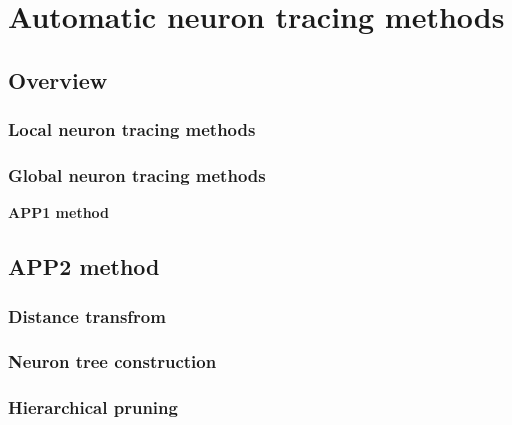 \chapter{Automatic neuron tracing methods}
\section{Overview}
\subsection{Local neuron tracing methods}
\subsection{Global neuron tracing methods}
\textbf{APP1 method}
\section{APP2 method}
\subsection{Distance transfrom}
\subsection{Neuron tree construction}
\subsection{Hierarchical pruning}
